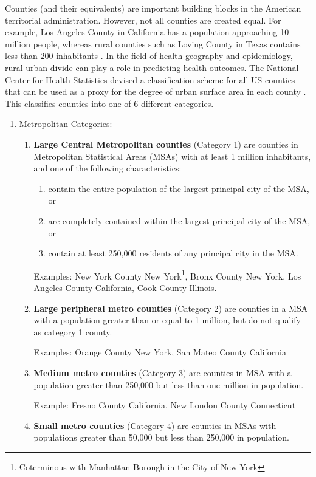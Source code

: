 Counties (and their equivalents) are important building blocks in the American territorial administration.  However, not all counties are created equal.  For example, Los Angeles County in California has a population approaching 10 million people, whereas rural counties such as Loving County in Texas contains less than 200 inhabitants \citep{USCensus13}.  In the field of health geography and epidemiology, rural-urban divide can play a role in predicting health outcomes.  The National Center for Health Statistics devised a classification scheme for all US counties that can be used as a proxy for the degree of urban surface area in each county \citep{national2014urban}. This classifies counties into one of 6 different categories.
\begin{enumerate}
	\item Metropolitan Categories:
	\begin{enumerate}
		\item \textbf{Large Central Metropolitan counties} (Category 1) are counties in Metropolitan Statistical Areas (MSAs) with at least 1 million inhabitants, and one of the following characteristics: 
		\begin{enumerate}
			\item contain the entire population of the largest principal city of the MSA, or 
			\item are completely contained within the largest principal city of the MSA, or 
			\item contain at least 250,000 residents of any principal city in the MSA.
		\end{enumerate}
		Examples: New York County New York\footnote{Coterminous with Manhattan Borough in the City of New York}, Bronx County New York, Los Angeles County California, Cook County Illinois. 
		
		\item  \textbf{Large peripheral metro counties} (Category 2) are counties in a MSA with a population greater than or equal to 1 million, but do not qualify as category 1 county.  
		
		Examples: Orange County New York, San Mateo County California
		
		
		\item \textbf{Medium metro counties} (Category 3) are counties in MSA with a population greater than 250,000 but less than one million in population.
		
		Example: Fresno County California, New London County Connecticut
		
		\item \textbf{Small metro counties} (Category 4) are counties in MSAs with populations greater than 50,000 but less than 250,000 in population.
		

\end{enumerate}
\end{enumerate}
